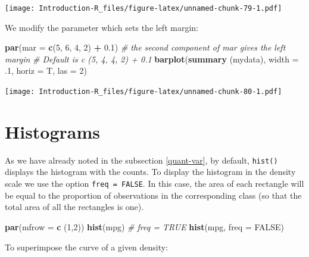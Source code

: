 \documentclass[]{book}
\newenvironment{Shaded}{\begin{snugshade}}{\end{snugshade}}
\newcommand{\CommentTok}[1]{\textcolor[rgb]{0.56,0.35,0.01}{\textit{#1}}}
\newcommand{\DataTypeTok}[1]{\textcolor[rgb]{0.13,0.29,0.53}{#1}}
\newcommand{\DecValTok}[1]{\textcolor[rgb]{0.00,0.00,0.81}{#1}}
\newcommand{\FloatTok}[1]{\textcolor[rgb]{0.00,0.00,0.81}{#1}}
\newcommand{\KeywordTok}[1]{\textcolor[rgb]{0.13,0.29,0.53}{\textbf{#1}}}
\newcommand{\NormalTok}[1]{#1}
\newcommand{\OperatorTok}[1]{\textcolor[rgb]{0.81,0.36,0.00}{\textbf{#1}}}
\newcommand{\OtherTok}[1]{\textcolor[rgb]{0.56,0.35,0.01}{#1}}
\newcommand{\StringTok}[1]{\textcolor[rgb]{0.31,0.60,0.02}{#1}}
\begin{document}
\texttt{[image: Introduction-R\_files/figure-latex/unnamed-chunk-79-1.pdf]}

We modify the parameter which sets the left margin:

\begin{Shaded}
\begin{Highlighting}[]
\KeywordTok{par}\NormalTok{(}\DataTypeTok{mar =} \KeywordTok{c}\NormalTok{(}\DecValTok{5}\NormalTok{, }\DecValTok{6}\NormalTok{, }\DecValTok{4}\NormalTok{, }\DecValTok{2}\NormalTok{) }\OperatorTok{+}\StringTok{ }\FloatTok{0.1}\NormalTok{) }\CommentTok{# the second component of mar gives the left margin}
\CommentTok{# Default is c (5, 4, 4, 2) + 0.1}
\KeywordTok{barplot}\NormalTok{(}\KeywordTok{summary}\NormalTok{ (mydata),}
        \DataTypeTok{width =} \FloatTok{.1}\NormalTok{,}
        \DataTypeTok{horiz =}\NormalTok{ T,}
        \DataTypeTok{las =} \DecValTok{2}\NormalTok{)}
\end{Highlighting}
\end{Shaded}

\texttt{[image: Introduction-R\_files/figure-latex/unnamed-chunk-80-1.pdf]}

\hypertarget{histograms}{%
\section{Histograms}\label{histograms}}

As we have already noted in the subsection \ref{quant-var}, by default, \texttt{hist()} displays the histogram with the counts. To display the histogram in the density scale we use the option \texttt{freq\ =\ FALSE}. In this case, the area of each rectangle will be equal to the proportion of observations in the corresponding class (so that the total area of all the rectangles is one).

\begin{Shaded}
\begin{Highlighting}[]
\KeywordTok{par}\NormalTok{(}\DataTypeTok{mfrow =} \KeywordTok{c}\NormalTok{ (}\DecValTok{1}\NormalTok{,}\DecValTok{2}\NormalTok{))}
\KeywordTok{hist}\NormalTok{(mpg) }\CommentTok{# freq = TRUE}
\KeywordTok{hist}\NormalTok{(mpg, }\DataTypeTok{freq =} \OtherTok{FALSE}\NormalTok{)}
\end{Highlighting}
\end{Shaded}

To superimpose the curve of a given density:
\end{document}
